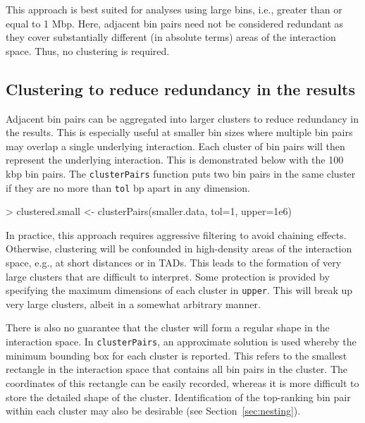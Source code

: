 \documentclass[12pt]{report}
\renewenvironment{Schunk}{\vspace{0pt}}{\vspace{0pt}}
\newcommand{\code}[1]{{\small\texttt{#1}}}
\begin{document}
This approach is best suited for analyses using large bins, i.e., greater than or equal to 1 Mbp.
Here, adjacent bin pairs need not be considered redundant as they cover substantially different (in absolute terms) areas of the interaction space.
Thus, no clustering is required.

\subsection{Clustering to reduce redundancy in the results}
Adjacent bin pairs can be aggregated into larger clusters to reduce redundancy in the results.
This is especially useful at smaller bin sizes where multiple bin pairs may overlap a single underlying interaction.
Each cluster of bin pairs will then represent the underlying interaction.
This is demonstrated below with the 100 kbp bin pairs.
The \code{clusterPairs} function puts two bin pairs in the same cluster if they are no more than \code{tol} bp apart in any dimension.

\begin{Schunk}
\begin{Sinput}
> clustered.small <- clusterPairs(smaller.data, tol=1, upper=1e6)
\end{Sinput}
\end{Schunk}

In practice, this approach requires aggressive filtering to avoid chaining effects.
Otherwise, clustering will be confounded in high-density areas of the interaction space, e.g., at short distances or in TADs.
This leads to the formation of very large clusters that are difficult to interpret.
Some protection is provided by specifying the maximum dimensions of each cluster in \code{upper}.
This will break up very large clusters, albeit in a somewhat arbitrary manner.

There is also no guarantee that the cluster will form a regular shape in the interaction space.
In \code{clusterPairs}, an approximate solution is used whereby the minimum bounding box for each cluster is reported.
This refers to the smallest rectangle in the interaction space that contains all bin pairs in the cluster.
The coordinates of this rectangle can be easily recorded, whereas it is more difficult to store the detailed shape of the cluster.
Identification of the top-ranking bin pair within each cluster may also be desirable (see Section~\ref{sec:nesting}).
\end{document}
